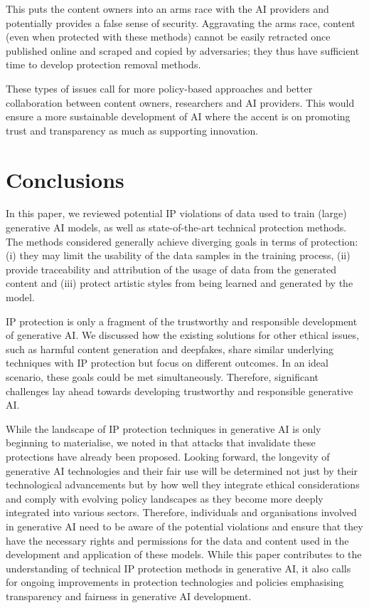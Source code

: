 \documentclass[conference,table]{IEEEtran}
\begin{document}
This puts the content owners into an arms race with the AI providers and potentially provides a false sense of security.
Aggravating the arms race, content (even when protected with these methods) cannot be easily retracted once published online and scraped and copied by adversaries; they thus have sufficient time to develop protection removal methods.

These types of issues call for more policy-based approaches and better collaboration between content owners, researchers and AI providers. 
This would ensure a more sustainable development of AI where the accent is on promoting trust and transparency as much as supporting innovation. 


\section{Conclusions}\label{sec:conclusion}
In this paper, we reviewed potential IP violations of data used to train (large) generative AI models, as well as state-of-the-art technical protection methods.
The methods considered generally achieve diverging goals in terms of protection: (i) they may limit the usability of the data samples in the training process, (ii) provide traceability and attribution of the usage of data from the generated content and (iii) protect artistic styles from being learned and generated by the model.

IP protection is only a fragment of the trustworthy and responsible development of generative AI.
We discussed how the existing solutions for other ethical issues, such as harmful content generation and deepfakes, share similar underlying techniques with IP protection but focus on different outcomes.
In an ideal scenario, these goals could be met simultaneously. Therefore, significant challenges lay ahead towards developing trustworthy and responsible generative AI. 

While the landscape of IP protection techniques in generative AI is only beginning to materialise, we noted in  that attacks that invalidate these protections have already been proposed.
Looking forward, the longevity of generative AI technologies and their fair use will be determined not just by their technological advancements but by how well they integrate ethical considerations and comply with evolving policy landscapes as they become more deeply integrated into various sectors.
Therefore, individuals and organisations involved in generative AI need to be aware of the potential violations and ensure that they have the necessary rights and permissions for the data and content used in the development and application of these models. 
While this paper contributes to the understanding of technical IP protection methods in generative AI, it also calls for ongoing improvements in protection technologies and policies emphasising transparency and fairness in generative AI development.



%  
  
\end{document}
